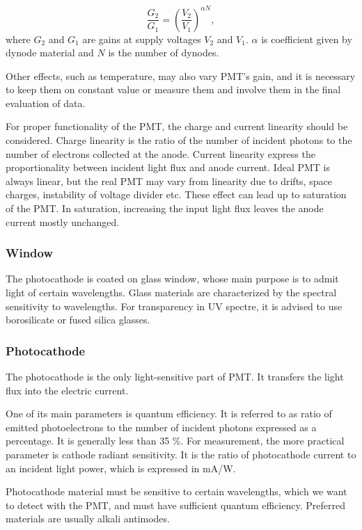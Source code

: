 \begin{equation}
\frac{G_2}{G_1} = (\frac{V_2}{V_1})^{\alpha N},
\label{gainVolt}
\end{equation}
where $G_2$ and $G_1$ are gains at supply voltages $V_2$ and $V_1$. $\alpha$ is coefficient given by dynode material and $N$ is the number of dynodes.
\par
Other effects, such as temperature, may also vary PMT's gain, and it is necessary to keep them on constant value or measure them and involve them in the final evaluation of data.
\par
For proper functionality of the PMT, the charge and current linearity should be considered. Charge linearity is the ratio of the number of incident photons to the number of electrons collected at the anode. Current linearity express the proportionality between incident light flux and anode current. Ideal PMT is always linear, but the real PMT may vary from linearity due to drifts, space charges, instability of voltage divider etc. These effect can lead up to saturation of the PMT. In saturation, increasing the input light flux leaves the anode current mostly unchanged.      


\subsubsection{Window}

The photocathode is coated on glass window, whose main purpose is to admit light of certain wavelengths. Glass materials are characterized by the spectral sensitivity to wavelengths. For transparency in UV spectre, it is advised to use borosilicate or fused silica glasses.


\subsubsection{Photocathode}

The photocathode is the only light-sensitive part of PMT. It transfers the light flux into the electric current.
\par
One of its main parameters is quantum efficiency. It is referred to as ratio of emitted photoelectrons to the number of incident photons expressed as a percentage. It is generally less than 35 \%. For measurement, the more practical parameter is cathode radiant sensitivity. It is the ratio of photocathode current to an incident light power, which is expressed in mA/W.
\par
Photocathode material must be sensitive to certain wavelengths, which we want to detect with the PMT, and must have sufficient quantum efficiency. Preferred materials are usually alkali antimodes.
